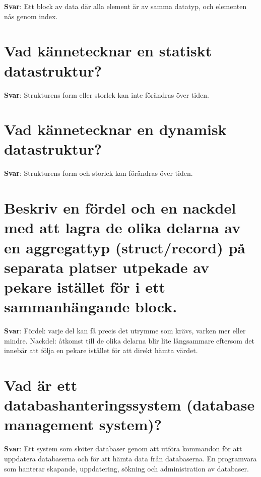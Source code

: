 \documentclass[a4paper,11pt,oneside]{book}
\begin{document}
\begin{sloppypar}
\textbf{Svar}: Ett block av data d\"ar alla element \"ar av samma datatyp, och elementen n\r{a}s genom index.



\section{Vad k\"annetecknar en statiskt datastruktur?}

\label{q:274:sa:sv:True}

\textbf{Svar}: Strukturens form eller storlek kan inte f\"or\"andras \"over tiden.



\section{Vad k\"annetecknar en dynamisk datastruktur?}

\label{q:275:sa:sv:True}

\textbf{Svar}: Strukturens form och storlek kan f\"or\"andras \"over tiden.



\section{Beskriv en f\"ordel och en nackdel med att lagra de olika delarna av en aggregattyp (struct/record) p\r{a} separata platser utpekade av pekare ist\"allet f\"or i ett sammanh\"angande block.}

\label{q:276:sa:sv:True}

\textbf{Svar}: F\"ordel: varje del kan f\r{a} precis det utrymme som kr\"avs, varken mer eller mindre. Nackdel: \r{a}tkomst till de olika delarna blir lite l\r{a}ngsammare eftersom det inneb\"ar att f\"olja en pekare ist\"allet f\"or att direkt h\"amta v\"ardet.



\section{Vad \"ar ett databashanteringssystem (database management system)?}

\label{q:277:sa:sv:True}

\textbf{Svar}: Ett system som sk\"oter databaser genom att utf\"ora kommandon f\"or att uppdatera databaserna och f\"or att h\"amta data fr\r{a}n databaserna. En programvara som hanterar skapande, uppdatering, s\"okning och administration av databaser.




\end{sloppypar}
\end{document}
